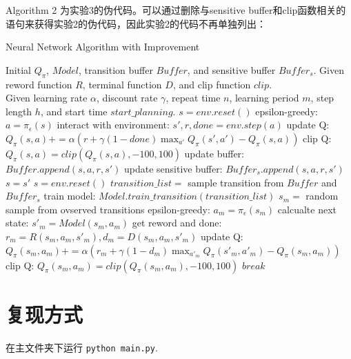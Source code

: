 \documentclass[a4paper,12pt]{article}
\begin{document}
\begin{CJK}{UTF8}{gbsn}
Algorithm 2 为实验3的伪代码。可以通过删除与sensitive buffer和clip函数相关的语句来获得实验2的伪代码，因此实验2的代码不再单独列出：
\newpage
\begin{algorithm}[H]
	\caption{Neural Network Algorithm with Improvement}
	\begin{algorithmic}[1]
		\STATE Initial $Q_\pi$, $Model$, transition buffer $Buffer$, and sensitive buffer $Buffer_s$. Given reword function $R$, terminal function $D$, and clip function $clip$. \\Given learning rate $\alpha$, discount rate $\gamma$, repeat time $n$, learning period $m$, step length $h$, and start time $start\_planning$.
		\STATE $s=env.reset()$
		\STATE epsilon-greedy: $a=\pi_\epsilon(s)$
		\STATE interact with environment: $s',r,done=env.step(a)$
		\STATE update Q: $Q_\pi(s,a)+=\alpha(r+\gamma(1-done)\max_{a'} Q_\pi(s',a')-Q_\pi(s,a))$
		\STATE clip Q: $Q_\pi(s,a)=clip(Q_\pi(s,a),-100,100)$
		\STATE update buffer: $Buffer.append(s,a,r,s')$
		\STATE update sensitive buffer: $Buffer_s.append(s,a,r,s')$
		\ENDIF
		\STATE $s=s'$
		\STATE $s=env.reset()$
		\ENDIF
		\ENDFOR
		\STATE $transition\_list=$ sample transition from $Buffer$ and $Buffer_s$
		\STATE train model: $Model.train\_transition(transition\_list)$
		\ENDFOR
		\STATE $s_m=$ random sample from ovserved transitions
		\STATE epsilon-greedy: $a_m=\pi_\epsilon(s_m)$
		\STATE calcualte next state: $s'_m=Model(s_m,a_m)$
		\STATE get reword and done: $r_m=R(s_m,a_m,s'_m),d_m=D(s_m,a_m,s'_m)$
		\STATE update Q: $Q_\pi(s_m,a_m)+=\alpha(r_m+\gamma (1-d_m)\max_{a'_m} Q_\pi(s'_m,a'_m)-Q_\pi(s_m,a_m))$
		\STATE clip Q: $Q_\pi(s_m,a_m)=clip(Q_\pi(s_m,a_m),-100,100)$
		\STATE $break$
		\ENDIF
		\ENDFOR
		\ENDFOR
		\ENDIF
		\ENDFOR
	\end{algorithmic}
\end{algorithm}
\section{复现方式}
在主文件夹下运行 \texttt{python main.py}.

\end{CJK}
\end{document}
